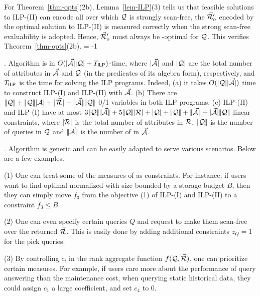 \vspace{0.6ex}
For Theorem~\ref{thm-opts}(2b),
Lemma~\ref{lem-ILP}(3) tells us that feasible solutions to
ILP-(II) can encode all \bdss over which $\mathcal Q$ is strongly
scan-free, \ie the \bds $\vec{{\mathcal R}}_{o}'$ encoded by the optimal
solution to ILP-(II) is measured correctly
when the strong scan-free evaluability is
adopted. Hence, $\vec{{\mathcal R}}_{o}'$ must always be \ssf-optimal for
$\mathcal Q$. This verifies Theorem~\ref{thm-opts}(2b). \eop
\looseness = -1


. Algorithm \opts is in
$O(|{\vec{{\mathcal A}}}||{\mathcal Q}| + T_{\protect\mathsf{ILP}} )$-time, where
$|{\vec{{\mathcal A}}}|$ and $|{\mathcal Q}|$ are the total number of attributes
in $\vec{{\mathcal A}}$ and $\mathcal Q$ (in the predicates of its algebra form),
respectively, and $T_{\protect\mathsf{ILP}}$ is the time for solving the ILP programs. 
Indeed, %
(a) it takes $O(|{\mathcal Q}||{\vec{{\mathcal A}}}|)$ time to construct ILP-(I) and
ILP-(II) with $\vec{{\mathcal A}}$.
(b) There are $\cdd{\Q} + \cdd{\Q}\cd{\A} + \cdd{\kb{\R}} + \cdd{\kb{\A}}\cdd{\Q}$ 0/1
variables in both ILP programs.
(c) ILP-(II) and ILP-(I) have at most
$3\cdd{\Q}\cdd{\kb{\A}} + 5\cdd{\Q}\cd{\R} + \cd{\Q} +
\cdd{\Q} + \cdd{\kb{\A}} + \cd{\kb{\A}}\cdd{\Q}$ linear
constraints, where $|{{\mathcal R}}|$ is the total number of attributes in
${\mathcal R}$, $|\!|{\mathcal Q}|\!|$ is the number of queries in $\mathcal Q$ and
$|\!|{\vec{{\mathcal A}}}|\!|$ is the number of \bss in $\vec{{\mathcal A}}$. 



. Algorithm \opts is generic and can be easily
adapted to serve various scenarios. Below are a few examples.

\sstab (1) One can treat some of the measures of \opts
as constraints. For instance, if users
want to find optimal normalized \bds with size bounded by a
storage budget $B$, then they can simply move $f_{3}$ from the
objective (1) of ILP-(I) and ILP-(II) to a constraint 
$f_{3}\leq B$.

\sstab (2) One can even specify certain queries $Q$ and request
to make them scan-free over the returned \bds $\vec{{\mathcal R}}$. This is
easily done by adding additional constraints $z_{Q} = 1$
for the pick queries.

\sstab (3) By controlling $c_{i}$ in the rank aggregate function
$f(\mathcal Q, \vec{{\mathcal R}})$, one can prioritize certain
measures. For example, if users care more about the
  performance of query answering than
the maintenance cost, \eg when querying static historical data,
they could assign $c_{1}$ a
  large coefficient, %
  and set $c_{4}$
to 0.

